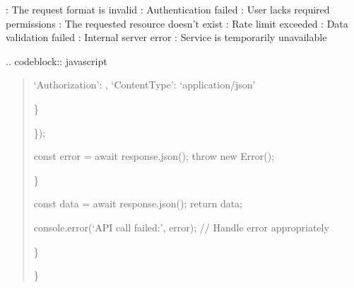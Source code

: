 \documentclass[letterpaper,10pt,english]{sphinxmanual}
\begin{document}
\sphinxAtStartPar
{}
\sphinxhyphen{} : The request format is invalid
\sphinxhyphen{} : Authentication failed
\sphinxhyphen{} : User lacks required permissions
\sphinxhyphen{} : The requested resource doesn’t exist
\sphinxhyphen{} : Rate limit exceeded
\sphinxhyphen{} : Data validation failed
\sphinxhyphen{} : Internal server error
\sphinxhyphen{} : Service is temporarily unavailable

\sphinxAtStartPar
{}
.. code\sphinxhyphen{}block:: javascript
\begin{quote}
\begin{description}
\begin{description}
\begin{description}
\begin{description}
\sphinxAtStartPar
‘Authorization’: ,
‘Content\sphinxhyphen{}Type’: ‘application/json’

\end{description}

\sphinxAtStartPar
\}

\end{description}

\sphinxAtStartPar
\});
\begin{description}
\sphinxAtStartPar
const error = await response.json();
throw new Error();

\end{description}

\sphinxAtStartPar
\}

\sphinxAtStartPar
const data = await response.json();
return data;

\sphinxAtStartPar
console.error(‘API call failed:’, error);
// Handle error appropriately

\end{description}

\sphinxAtStartPar
\}

\end{description}

\sphinxAtStartPar
\}
\end{quote}
\end{document}

